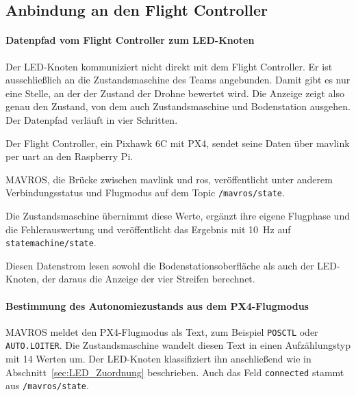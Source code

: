         \subsection{Anbindung an den Flight Controller}
        \label{sec:LED_FC}

            \paragraph{Datenpfad vom Flight Controller zum LED-Knoten}
            Der LED-Knoten kommuniziert nicht direkt mit dem Flight Controller. Er ist ausschließlich an die Zustandsmaschine des Teams angebunden. Damit gibt es nur eine Stelle, an der der Zustand der Drohne bewertet wird. Die Anzeige zeigt also genau den Zustand, von dem auch Zustandsmaschine und Bodenstation ausgehen. Der Datenpfad verläuft in vier Schritten.

            \begin{description}[style=nextline]
                \item[Flight Controller] Der Flight Controller, ein Pixhawk 6C mit PX4, sendet seine Daten über \gls{mavlink} per \gls{uart} an den Raspberry Pi.
                \item[MAVROS] MAVROS, die Brücke zwischen \gls{mavlink} und \gls{ros}, veröffentlicht unter anderem Verbindungsstatus und Flugmodus auf dem Topic \texttt{/mavros/state}. %
                \item[Zustandsmaschine] Die Zustandsmaschine übernimmt diese Werte, ergänzt ihre eigene Flugphase und die Fehlerauswertung und veröffentlicht das Ergebnis mit \SI{10}{\hertz} auf \texttt{statemachine/state}.
                \item[Bodenstation und LED-Knoten] Diesen Datenstrom lesen sowohl die Bodenstationsoberfläche als auch der LED-Knoten, der daraus die Anzeige der vier Streifen berechnet.
            \end{description}

            \paragraph{Bestimmung des Autonomiezustands aus dem PX4-Flugmodus}
            MAVROS meldet den PX4-Flugmodus als Text, zum Beispiel \texttt{POSCTL} oder \texttt{AUTO.LOITER}. Die Zustandsmaschine wandelt diesen Text in einen Aufzählungstyp mit 14 Werten um. Der LED-Knoten klassifiziert ihn anschließend wie in Abschnitt~\ref{sec:LED_Zuordnung} beschrieben. Auch das Feld \texttt{connected} stammt aus \texttt{/mavros/state}.

